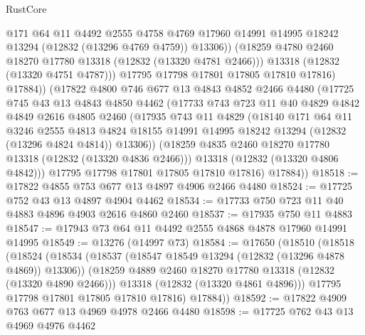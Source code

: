 \begin{lexlean}{RustCore}
\begin{coremodule}
                  @171
                  @64
                  @11
                  @4492
                  @2555
                  @4758
                  @4769
                  @17960
                  @14991
                  @14995
                  @18242
                  @13294
                  (@12832 (@13296 @4769 @4759))
                  @13306))
              (@18259 @4780 @2460 @18270 @17780 @13318 (@12832 (@13320 @4781 @2466)))
              @13318
              (@12832 (@13320 @4751 @4787)))
            @17795
            @17798
            @17801
            @17805
            @17810
            @17816)
          @17884))
      (@17822
        @4800
        @746
        @677
        @13
        @4843
        @4852
        @2466
        @4480
        (@17725
          @745
          @43
          @13
          @4843
          @4850
          @4462
          (@17733
            @743
            @723
            @11
            @40
            @4829
            @4842
            @4849
            @2616
            @4805
            @2460
            (@17935
              @743
              @11
              @4829
              (@18140
                @171
                @64
                @11
                @3246
                @2555
                @4813
                @4824
                @18155
                @14991
                @14995
                @18242
                @13294
                (@12832 (@13296 @4824 @4814))
                @13306))
            (@18259 @4835 @2460 @18270 @17780 @13318 (@12832 (@13320 @4836 @2466)))
            @13318
            (@12832 (@13320 @4806 @4842)))
          @17795
          @17798
          @17801
          @17805
          @17810
          @17816)
        @17884))
@18518 := @17822 @4855 @753 @677 @13 @4897 @4906 @2466 @4480
@18524 := @17725 @752 @43 @13 @4897 @4904 @4462
@18534 := @17733 @750 @723 @11 @40 @4883 @4896 @4903 @2616 @4860 @2460
@18537 := @17935 @750 @11 @4883
@18547 := @17943 @73 @64 @11 @4492 @2555 @4868 @4878 @17960 @14991 @14995
@18549 := @13276 (@14997 @73)
@18584 := @17650
    (@18510
      (@18518
        (@18524
          (@18534
            (@18537 (@18547 @18549 @13294 (@12832 (@13296 @4878 @4869)) @13306))
            (@18259 @4889 @2460 @18270 @17780 @13318 (@12832 (@13320 @4890 @2466)))
            @13318
            (@12832 (@13320 @4861 @4896)))
          @17795
          @17798
          @17801
          @17805
          @17810
          @17816)
        @17884))
@18592 := @17822 @4909 @763 @677 @13 @4969 @4978 @2466 @4480
@18598 := @17725 @762 @43 @13 @4969 @4976 @4462

\end{coremodule}
\end{lexlean}
